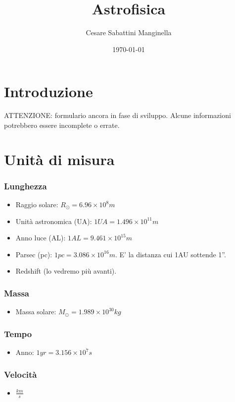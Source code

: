 \documentclass{article}
\title{Astrofisica}
\author{Cesare Sabattini Manginella}
\date{\today}
\begin{document}
\maketitle

\begin{abstract}

    
\end{abstract}

\section{Introduzione}
ATTENZIONE: formulario ancora in fase di sviluppo. Alcune informazioni potrebbero essere incomplete o errate.

\section{Unità di misura}
\subsubsection{Lunghezza}
\begin{itemize}
    \item Raggio solare: $R_{\odot} = 6.96 \times 10^8 m$
    \item Unità astronomica (UA): $1 UA = 1.496 \times 10^{11} m$
    \item Anno luce (AL): $1 AL = 9.461 \times 10^{15} m$
    \item Parsec (pc): $1 pc = 3.086 \times 10^{16} m$. E' la distanza cui 1AU sottende 1''.
    \item Redshift (lo vedremo più avanti).
\end{itemize}
\subsubsection{Massa}
\begin{itemize}
    \item Massa solare: $M_{\odot} = 1.989 \times 10^{30} kg$
    
\end{itemize}
\subsubsection{Tempo}
\begin{itemize}
    \item Anno: $1 yr = 3.156 \times 10^7 s$
\end{itemize}
\subsubsection{Velocità}
\begin{itemize}
    \item $\frac{km}{s}$
\end{itemize}
\end{document}
